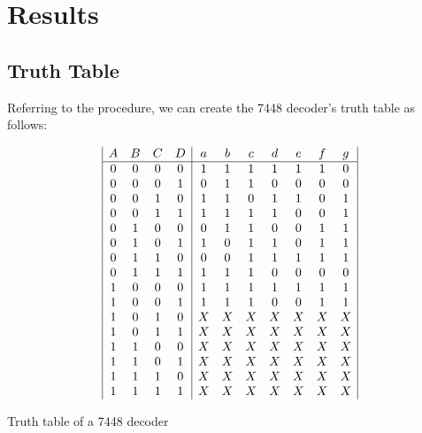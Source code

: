 \section{Results}

\subsection{Truth Table}

Referring to the procedure, we can create the 7448 decoder's truth table as follows:

\begin{table}[h!]
    \centering
    \begin{displaymath}
        \begin{array}{|c c c c|c c c c c c c|}
        A & B & C & D    &   a & b & c & d & e & f & g\\
        \hline
        0 & 0 & 0 & 0    &   1 & 1 & 1 & 1 & 1 & 1 & 0\\
        0 & 0 & 0 & 1    &   0 & 1 & 1 & 0 & 0 & 0 & 0\\
        0 & 0 & 1 & 0    &   1 & 1 & 0 & 1 & 1 & 0 & 1\\
        0 & 0 & 1 & 1    &   1 & 1 & 1 & 1 & 0 & 0 & 1\\
        0 & 1 & 0 & 0    &   0 & 1 & 1 & 0 & 0 & 1 & 1\\
        0 & 1 & 0 & 1    &   1 & 0 & 1 & 1 & 0 & 1 & 1\\
        0 & 1 & 1 & 0    &   0 & 0 & 1 & 1 & 1 & 1 & 1\\
        0 & 1 & 1 & 1    &   1 & 1 & 1 & 0 & 0 & 0 & 0\\
        1 & 0 & 0 & 0    &   1 & 1 & 1 & 1 & 1 & 1 & 1\\
        1 & 0 & 0 & 1    &   1 & 1 & 1 & 0 & 0 & 1 & 1\\
        1 & 0 & 1 & 0    &   X & X & X & X & X & X & X\\
        1 & 0 & 1 & 1    &   X & X & X & X & X & X & X\\
        1 & 1 & 0 & 0    &   X & X & X & X & X & X & X\\
        1 & 1 & 0 & 1    &   X & X & X & X & X & X & X\\
        1 & 1 & 1 & 0    &   X & X & X & X & X & X & X\\
        1 & 1 & 1 & 1    &   X & X & X & X & X & X & X\\
        \end{array}
    \end{displaymath}
    \caption{Truth table of a 7448 decoder}
    \label{tab:my_label}
\end{table}

